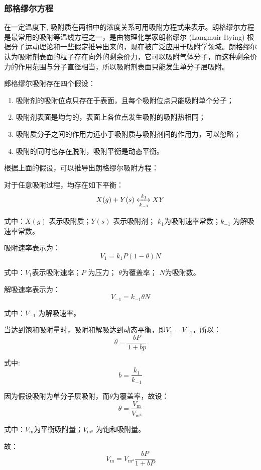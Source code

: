 \subsubsection{郎格缪尔方程}\label{郎格缪尔吸附}
\par{在一定温度下, 吸附质在两相中的浓度关系可用吸附方程式来表示\cite{吴焕领2006吸附等温线的介绍及应用}。朗格缪尔方程是最常用的吸附等温线方程之一，是由物理化学家朗格缪尔 (Langmuir Itying) 根据分子运动理论和一些假定推导出来的，现在被广泛应用于吸附学领域。朗格缪尔认为吸附剂表面的粒子存在向外的剩余价力，它可以吸附气体分子，而这种剩余价力的作用范围与分子直径相当，所以吸附剂表面只能发生单分子层吸附。}
\par{郎格缪尔吸附存在四个假设：}
\begin{enumerate}
    \item 吸附剂的吸附位点只存在于表面，且每个吸附位点只能吸附单个分子；
    \item 吸附剂表面是均匀的，表面上各位点发生吸附的吸附热相同；
    \item 吸附质分子之间的作用力远小于吸附质与吸附剂间的作用力，可以忽略；
    \item 吸附的同时也存在脱附，吸附平衡是动态平衡。
\end{enumerate}
\par{根据上面的假设，可以推导出朗格缪尔吸附方程：}
\par{对于任意吸附过程，均存在如下平衡：}
\begin{equation}
    X(g)+Y(s) \xleftrightarrow[k_{-1}]{k_1} X Y
\end{equation}
\par{式中：$X(g)$ 表示吸附质；$Y(s)$ 表示吸附剂； $k_1$为吸附速率常数；$k_{-1}$ 为解吸速率常数。}
\par{吸附速率表示为：}
\begin{equation}
    V_{1}=k_{1} P(1-\theta) N
\end{equation}
\par{式中：$V_{1}$表示吸附速率；$P$ 为压力； $\theta$为覆盖率； $N$为吸附数。}
\par{解吸速率表示为：}
\begin{equation}
    V_{-1}=k_{-1} \theta N
\end{equation}
\par{式中：$V_{-1}$ 为解吸速率。}
\par{当达到饱和吸附量时，吸附和解吸达到动态平衡，即$V_{1}=V_{-1}$，所以：}
\begin{equation}
    \theta=\frac{b P}{1+b p}
\end{equation}
\par{式中:}
\begin{equation}
    b=\frac{k_{1}}{k_{-1}}
\end{equation}
\par{因为假设吸附为单分子层吸附，而$\theta$为覆盖率，故设：}
\begin{equation}
    \theta=\frac{V_{\mathrm{m}}}{V_{\mathrm{m}^{a}}}
\end{equation}
\par{式中：$V_{\mathrm{m}}$为平衡吸附量；$V_{\mathrm{m}^{a}}$ 为饱和吸附量。}
\par{故：}
\begin{equation}
    V_{\mathrm{m}}=V_{\mathrm{m}^{\mathrm{a}}} \frac{b P}{1+b P}
\end{equation}
